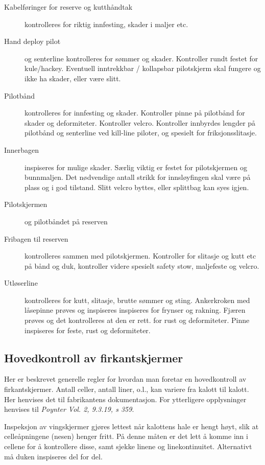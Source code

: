 \begin{description}
	\item[Kabelføringer for reserve og kutthåndtak] kontrolleres for riktig innfesting, skader i maljer etc.

	\item[Hand deploy pilot] og senterline kontrolleres for sømmer og skader. Kontroller rundt festet for kule/hackey. Eventuell inntrekkbar / kollapsbar pilotskjerm skal fungere og ikke ha skader, eller være slitt.

	\item[Pilotbånd] kontrolleres for innfesting og skader. Kontroller pinne på pilotbånd for skader og deformiteter. Kontroller velcro. Kontroller innbyrdes lengder på pilotbånd og senterline ved kill-line piloter, og spesielt for friksjonsslitasje.

	\item[Innerbagen] inspiseres for mulige skader. Særlig viktig er festet for pilotskjermen og bunnmaljen. Det nødvendige antall strikk for innsløyfingen skal være på plass og i god tilstand. Slitt velcro byttes, eller splittbag kan syes igjen.

	\item[Pilotskjermen] og pilotbåndet på reserven

	\item[Fribagen til reserven] kontrolleres sammen med pilotskjermen. Kontroller for slitasje og kutt etc på bånd og duk, kontroller videre spesielt safety stow, maljefeste og velcro.

	\item[Utløserline] kontrolleres for kutt, slitasje, brutte sømmer og sting. Ankerkroken med låsepinne prøves og inspiseres inspiseres for frynser og rakning. Fjæren prøves og det kontrolleres at den er rett. for rust og deformiteter. Pinne inspiseres for feste, rust og deformiteter.
\end{description}

\subsection{Hovedkontroll av firkantskjermer}
Her er beskrevet generelle regler for hvordan man foretar en hovedkontroll av firkantskjermer. Antall celler, antall liner, o.l., kan variere fra kalott til kalott. Her henvises det til fabrikantens dokumentasjon. For ytterligere opplysninger henvises til \emph{Poynter Vol. 2, 9.3.19, s 359}.

Inspeksjon av vingskjermer gjøres lettest når kalottens hale er hengt høyt, slik at celleåpningene (nesen) henger fritt. På denne måten er det lett å komme inn i cellene for å kontrollere disse, samt sjekke linene og linekontinuitet. Alternativt må duken inspiseres del for del.

